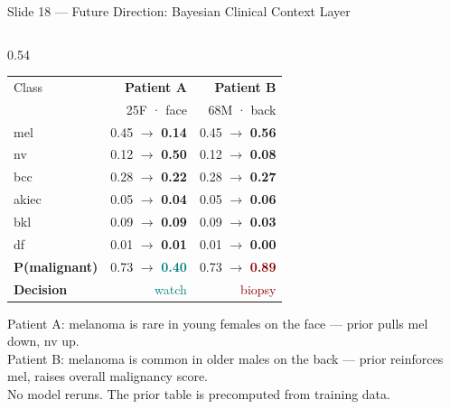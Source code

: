 \documentclass[aspectratio=169, 9pt]{beamer}
\begin{document}
\begin{frame}{Slide 18 --- Future Direction: Bayesian Clinical Context Layer}
\begin{columns}[T]
\begin{column}{0.54\textwidth}
      \vspace{0.4em}
      {\small
      \begin{tabular}{@{} l r r @{}}
        \toprule
        Class & \textbf{Patient A} & \textbf{Patient B} \\
              & {\scriptsize 25F · face} & {\scriptsize 68M · back} \\
        \midrule
        {\color{darkred}mel}   & 0.45 $\to$ \textbf{0.14} & 0.45 $\to$ \textbf{0.56} \\
        {\color{teal}nv}       & 0.12 $\to$ \textbf{0.50} & 0.12 $\to$ \textbf{0.08} \\
        {\color{darkred}bcc}   & 0.28 $\to$ \textbf{0.22} & 0.28 $\to$ \textbf{0.27} \\
        {\color{darkred}akiec} & 0.05 $\to$ \textbf{0.04} & 0.05 $\to$ \textbf{0.06} \\
        {\color{teal}bkl}      & 0.09 $\to$ \textbf{0.09} & 0.09 $\to$ \textbf{0.03} \\
        {\color{teal}df}       & 0.01 $\to$ \textbf{0.01} & 0.01 $\to$ \textbf{0.00} \\
        \midrule
        \textbf{P(malignant)}  & 0.73 $\to$ \textcolor{teal}{\textbf{0.40}} & 0.73 $\to$ \textcolor{darkred}{\textbf{0.89}} \\
        \textbf{Decision}      & \textcolor{teal}{watch} & \textcolor{darkred}{biopsy} \\
        \bottomrule
      \end{tabular}
      }

      \vspace{0.3em}
      {\scriptsize\color{gray}
      Patient A: melanoma is rare in young females on the face ---
      prior pulls mel down, nv up.\\
      Patient B: melanoma is common in older males on the back ---
      prior reinforces mel, raises overall malignancy score.\\[0.3em]
      No model reruns. The prior table is precomputed from training data.}
    \end{column}

  \end{columns}
\end{frame}
\end{document}
